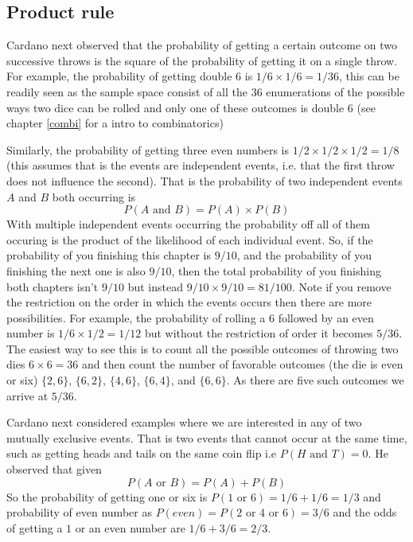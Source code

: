 \subsection{Product rule}

Cardano next observed that the probability of getting a certain outcome on two successive throws is the square of the probability of getting it on a single throw. For example, the probability of getting double $6$ is $1/6 \times 1/6 = 1/36$, this can be readily seen as the sample space consist of all the 36 enumerations of the possible ways two dice can be rolled and only one of these outcomes is double $6$ (see chapter \ref{combi} for a intro to combinatorics)

Similarly, the probability of getting three even numbers is $1/2 \times 1/2 \times 1/2 = 1/8$ (this assumes that is the events are independent events, i.e. that the first throw does not influence the second). That is the probability of two independent events $A$ and $B$ both occurring is
\begin{equation}\label{prob:compound-event}
P(A \text{ and } B) = P(A) \times P(B)
\end{equation}
With multiple independent events occurring the probability off all of them occuring is the product of the likelihood of each individual event. So, if the probability of you finishing this chapter is $9/10$, and the probability of you finishing the next one is also $9/10$, then the total probability of you finishing both chapters isn't $9/10$ but instead $9/10 \times 9/10 = 81/100$. Note if you remove the restriction on the order in which the events occurs then there are more possibilities. For example, the probability of rolling a $6$ followed by an even number is $1/6 \times 1/2 = 1/12$ but without the restriction of order it becomes $5/36$. The easiest way to see this is to count all the possible outcomes of throwing two dies $6 \times 6 = 36$ and then count the number of favorable outcomes (the die is even or six) $\{2,6\}$, $\{6,2\}$, $\{4,6\}$, $\{6,4\}$, and $\{6,6\}$. As there are five such outcomes we arrive at $5/36$.

\myindent Cardano next considered examples where we are interested in any of two  mutually exclusive events. That is two events that cannot occur at the same time, such as getting heads and tails on the same coin flip i.e $P(H \text{ and } T) = 0$. He observed that given
\begin{equation}\label{prob:exclusive-event}
P(A \text{ or } B) = P(A) + P(B)
\end{equation}
So the probability of getting one or six is $P(1 \text{ or } 6) = 1/6 + 1/6 = 1/3$ and probability of even number as $P(even) = P(2 \text{ or } 4 \text{ or } 6) = 3/6$ and the odds of getting a $1$ or an even number are $1/6 + 3/6 = 2/3$.

